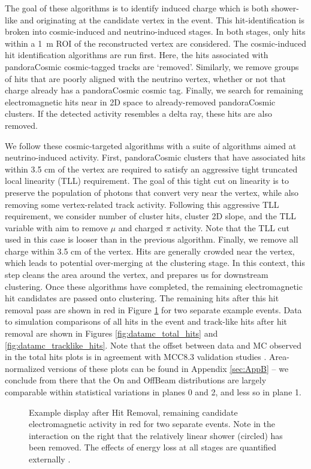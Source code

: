 \documentclass{article}
\begin{document}
\par The goal of these algorithms is to identify induced charge which is both shower-like and originating at the candidate vertex in the event. This hit-identification is broken into cosmic-induced and neutrino-induced stages.  In both stages, only hits within a 1~m ROI of the reconstructed vertex are considered. The cosmic-induced hit identification algorithms are run first.  Here, the hits associated with pandoraCosmic cosmic-tagged tracks are `removed'.  Similarly, we remove groups of hits that are poorly aligned with the neutrino vertex, whether or not that charge already has a pandoraCosmic cosmic tag. Finally, we search for remaining electromagnetic hits near in 2D space to already-removed pandoraCosmic clusters. If the detected activity resembles a delta ray, these hits are also removed. 
\par We follow these cosmic-targeted algorithms with a suite of algorithms aimed at neutrino-induced activity. First, pandoraCosmic clusters that have associated hits within 3.5 cm of the vertex are required to satisfy an aggressive tight truncated local linearity (TLL) requirement. The goal of this tight cut on linearity is to preserve the population of photons that convert very near the vertex, while also removing some vertex-related track activity. Following this aggressive TLL requirement, we consider number of cluster hits, cluster 2D slope, and the TLL variable with aim to remove $\mu$ and charged $\pi$ activity. Note that the TLL cut used in this case is looser than in the previous algorithm. Finally, we remove all charge within 3.5 cm of the vertex. Hits are generally crowded near the vertex, which leads to potential over-merging at the clustering stage. In this context, this step cleans the area around the vertex, and prepares us for downstream clustering. Once these algorithms have completed, the remaining electromagnetic hit candidates are passed onto clustering. The remaining hits after this hit removal pass are shown in red in Figure \ref{fig:hitremoval} for two separate example events. Data to simulation comparisons of all hits in the event and track-like hits after hit removal are shown in Figures \ref{fig:datamc_total_hits} and \ref{fig:datamc_tracklike_hits}.  Note that the offset between data and MC observed in the total hits plots is in agreement with MCC8.3 validation studies \cite{bib:mcc83_validation_plots}. Area-normalized versions of these plots can be found in Appendix \ref{sec:AppB} -- we conclude from there that the On and OffBeam distributions are largely comparable within statistical variations in planes 0 and 2, and less so in plane 1.   
\begin{figure}[h!]
\centering
{}
\caption{ Example display after Hit Removal, remaining candidate electromagnetic activity in red for two separate events. Note in the interaction on the right that the relatively linear shower (circled) has been removed. The effects of energy loss at all stages are quantified externally \cite{bib:davidc_missingE}.} 
\label{fig:hitremoval}
\end{figure}
\end{document}
